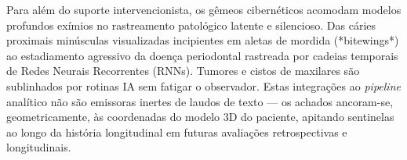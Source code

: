 Para além do suporte intervencionista, os gêmeos cibernéticos acomodam modelos profundos exímios no rastreamento patológico latente e silencioso. Das cáries proximais minúsculas visualizadas incipientes em aletas de mordida (*bitewings*) ao estadiamento agressivo da doença periodontal rastreada por cadeias temporais de Redes Neurais Recorrentes (RNNs). Tumores e cistos de maxilares são sublinhados por rotinas IA sem fatigar o observador. Estas integrações ao \textit{pipeline} analítico não são emissoras inertes de laudos de texto — os achados ancoram-se, geometricamente, às coordenadas do modelo 3D do paciente, apitando sentinelas ao longo da história longitudinal em futuras avaliações retrospectivas e longitudinais.
